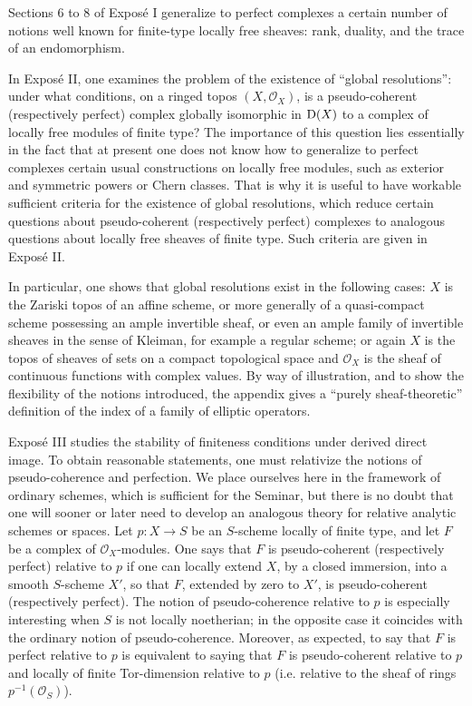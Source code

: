 \documentclass[11pt]{article}
\begin{document}
Sections 6 to 8 of Exposé I generalize to perfect complexes a certain number of notions well known for finite-type locally free sheaves: rank, duality, and the trace of an endomorphism.

In Exposé II, one examines the problem of the existence of ``global resolutions'': under what conditions, on a ringed topos \((X,\mathcal O_X)\), is a pseudo-coherent (respectively perfect) complex globally isomorphic in \(\mathrm D(X)\) to a complex of locally free modules of finite type? The importance of this question lies essentially in the fact that at present one does not know how to generalize to perfect complexes certain usual constructions on locally free modules, such as exterior and symmetric powers or Chern classes. That is why it is useful to have workable sufficient criteria for the existence of global resolutions, which reduce certain questions about pseudo-coherent (respectively perfect) complexes to analogous questions about locally free sheaves of finite type. Such criteria are given in Exposé II.

In particular, one shows that global resolutions exist in the following cases: \(X\) is the Zariski topos of an affine scheme, or more generally of a quasi-compact scheme possessing an ample invertible sheaf, or even an ample family of invertible sheaves in the sense of Kleiman, for example a regular scheme; or again \(X\) is the topos of sheaves of sets on a compact topological space and \(\mathcal O_X\) is the sheaf of continuous functions with complex values. By way of illustration, and to show the flexibility of the notions introduced, the appendix gives a ``purely sheaf-theoretic'' definition of the index of a family of elliptic operators.

Exposé III studies the stability of finiteness conditions under derived direct image. To obtain reasonable statements, one must relativize the notions of pseudo-coherence and perfection. We place ourselves here in the framework of ordinary schemes, which is sufficient for the Seminar, but there is no doubt that one will sooner or later need to develop an analogous theory for relative analytic schemes or spaces. Let \(p:X\to S\) be an \(S\)-scheme locally of finite type, and let \(F\) be a complex of \(\mathcal O_X\)-modules. One says that \(F\) is pseudo-coherent (respectively perfect) relative to \(p\) if one can locally extend \(X\), by a closed immersion, into a smooth \(S\)-scheme \(X'\), so that \(F\), extended by zero to \(X'\), is pseudo-coherent (respectively perfect). The notion of pseudo-coherence relative to \(p\) is especially interesting when \(S\) is not locally noetherian; in the opposite case it coincides with the ordinary notion of pseudo-coherence. Moreover, as expected, to say that \(F\) is perfect relative to \(p\) is equivalent to saying that \(F\) is pseudo-coherent relative to \(p\) and locally of finite Tor-dimension relative to \(p\) (i.e. relative to the sheaf of rings \(p^{-1}(\mathcal O_S)\)).
\end{document}
